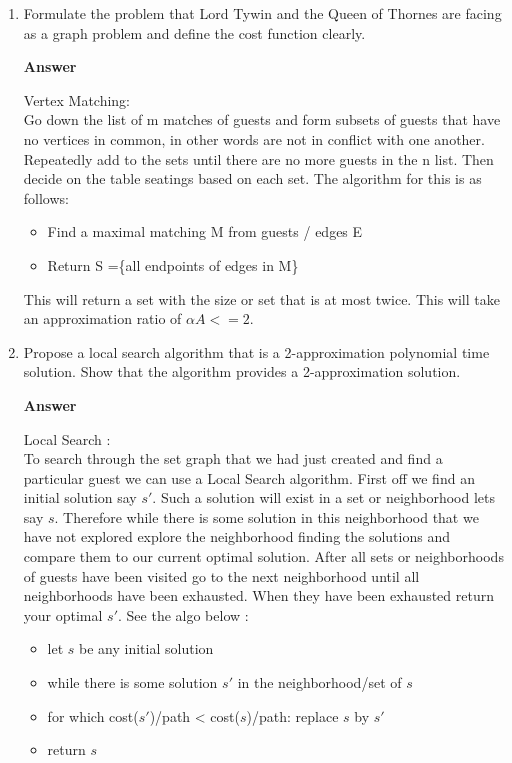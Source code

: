 \documentclass{article}
\begin{document}
\begin{enumerate}
\item Formulate the problem that Lord Tywin and the Queen of Thornes
  are facing as a graph problem and define the cost function clearly.

\textbf{ Answer }
\vspace{0.1in}
\begin{adjustwidth}{1.8em}{0pt}
Vertex Matching:\\

Go down the list of m matches of guests and form subsets of guests that have no vertices in common, in other words are not in conflict with one another. Repeatedly add to the sets until there are no more guests in the n list. Then decide on the table seatings based on each set. The algorithm for this is as follows:
\begin{itemize}
\item Find a maximal matching M from guests / edges E
\item Return S =\{all endpoints of edges in M\}
\end{itemize}
This will return a set with the size or set that is at most twice. This will take an approximation ratio of $\alpha A <= 2$.
\end{adjustwidth}
\vspace{0.1in}

\item Propose a local search algorithm that is a 2-approximation
  polynomial time solution. Show that the algorithm provides a
  2-approximation solution.

\textbf{ Answer }
\vspace{0.1in}
\begin{adjustwidth}{1.8em}{0pt}
Local Search :\\

To search through the set graph that we had just created and find a particular guest we can use a Local Search algorithm. First off we find an initial solution say $s'$. Such a solution will exist in a set or neighborhood lets say $s$. Therefore while there is some solution in this neighborhood that we have not explored explore the neighborhood finding the solutions and compare them to our current optimal solution. After all sets or neighborhoods of guests have been visited go to the next neighborhood until all neighborhoods have been exhausted. When they have been exhausted return your optimal $s'$. See the algo below :
\begin{itemize}
\item let $s$ be any initial solution
\item while there is some solution $s'$ in the neighborhood/set of $s$
\item for which cost($s'$)/path < cost($s$)/path: replace $s$ by $s′$ 
\item return $s$
\end{itemize}
\end{adjustwidth}
\vspace{0.1in}


\end{enumerate}
\end{document}
